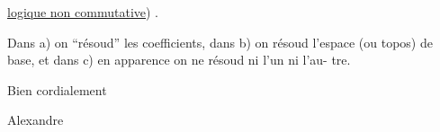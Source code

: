  

\uline{logique non commutative}) .

Dans a)  on ``résoud''  les coefficients, dans  b) on résoud l'espace
(ou topos) de base, et dans c)  en apparence on ne résoud ni l'un ni l'au-%
tre.

Bien cordialement

Alexandre

